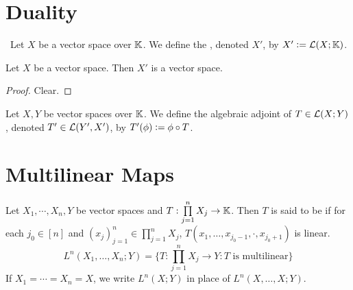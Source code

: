 \documentclass{book}
\begin{document}
	
	
	
	
	\newpage 
	\section{Duality}
	
	\begin{defn} \
		Let $X$ be a vector space over $\mathbb{K}$. We define the , denoted $X'$, by $X' \vcentcolon= \mathcal{L}(X;\mathbb{K})$. 
	\end{defn}
	
	
	\begin{ex}
		Let $X$ be a vector space. Then $X'$ is a vector space. 
	\end{ex}
	
	\begin{proof}
		Clear.
	\end{proof}
	
	
	\begin{defn}
		Let $X, Y$ be vector spaces over $\mathbb{K}$. We define the algebraic adjoint of $T \in \mathcal{L}(X;Y)$, denoted $T' \in \mathcal{L}(Y', X')$, by $T'(\phi) \vcentcolon= \phi \circ T$. 
	\end{defn}
	
	
	
	
	
	
	
	
	
	
	
	
	
	
	
	
	
	
	
	
	
	
	
	
	
	
	
	
	
	
	
	
	
	
	
	
	
	
	
	
	
	
	
	
	
	
	
	\newpage
	\section{Multilinear Maps}
	
	\begin{defn}
		Let $X_1, \cdots, X_n, Y$ be vector spaces and $T: \prod\limits_{j=1}^n X_j \rightarrow \mathbb{K}$. Then $T$ is said to be  if for each $j_0 \in [n]$ and $(x_j)_{j=1}^n \in \prod\limits_{j=1}^n X_j$, $T(x_1, \ldots, x_{j_0 - 1}, \cdot, x_{j_0 + 1})$ is linear. $$L^n(X_1, \dots, X_n; Y) = \bigg\{T : \prod\limits_{j=1}^n X_j \rightarrow Y: T \text{ is multilinear}\bigg \}$$ 
		If $X_1 = \cdots = X_n = X$, we write $L^n(X;Y)$ in place of $L^n (X, \dots, X; Y) $. 
	\end{defn}
	
\end{document}

